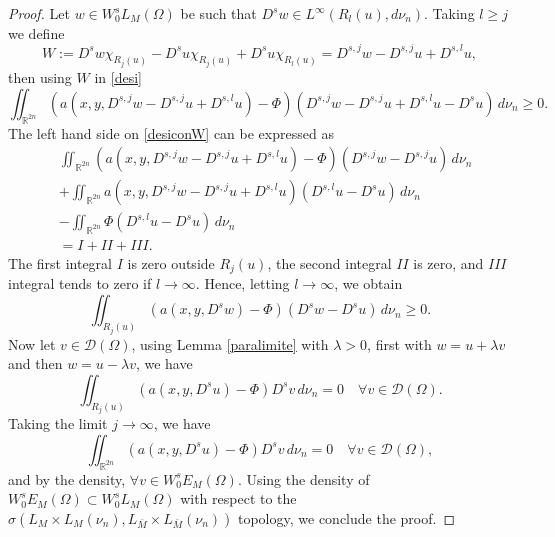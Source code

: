 \documentclass{amsart}
\newcommand{\R}{{\mathbb R}}
\theoremstyle{remark}
\theoremstyle{definition}
\numberwithin{equation}{section}
\begin{document}
\begin{proof}
Let $w \in W_0^sL_M(\Omega)$ be such that $D^s w \in L^\infty(R_l(u),d\nu_n)$. Taking $l\geq j$ we define
$$
W:=D^s w\chi_{R_j(u)}-D^s u\chi_{R_j(u)}+D^s u\chi_{R_{l}(u)}=D^{s,j}w-D^{s,j}u+D^{s,l}u,
$$
then using $W$ in \eqref{desi}
\begin{equation}\label{desiconW}
\iint_{\mathbb{R}^{2n}}(a(x,y,D^{s,j}w-D^{s,j}u+D^{s,l}u)-\Phi)(D^{s,j}w-D^{s,j}u+D^{s,l}u-D^su)\,d\nu_n \geq 0.
\end{equation}
The left hand side on \eqref{desiconW} can be expressed as
\begin{align*}
&\iint_{\R^{2n}}(a(x,y,D^{s,j} w - D^{s,j} u + D^{s,l} u) - \Phi)(D^{s,j} w - D^{s,j} u)\,d\nu_n 
\\
&+\iint_{\R^{2n}}a(x,y,D^{s,j} w - D^{s,j} u + D^{s,l} u)(D^{s,l} u - D^s u)\,d\nu_n 
\\
&-\iint_{\R^{2n}}\Phi(D^{s,l} u-D^s u)\, d\nu_n
\\
&=I+II+III.	
\end{align*}
The first integral $I$ is zero outside $R_j(u)$, the second integral $II$  is zero, and $III$ integral tends to zero if $l\to \infty$. Hence, letting $l \to \infty$, we obtain
$$
\iint_{R_j(u)} \left(a(x,y,D^s w) - \Phi \right)(D^s w - D^s u)\, d\nu_n \geq 0.
$$
Now let $v \in \mathcal{D}(\Omega)$, using Lemma \ref{paralimite} with $\lambda > 0$, first with $w = u + \lambda v$ and then $w = u - \lambda v$, we have
$$
\iint_{R_j(u)} \left(a(x,y,D^s u) - \Phi \right) D^s v \, d\nu_n = 0 \quad \forall v \in \mathcal{D}(\Omega).
$$
Taking the limit $j \to \infty$, we have
$$
\iint_{\mathbb{R}^{2n}} \left(a(x,y,D^s u) - \Phi \right) D^s v \, d\nu_n = 0 \quad \forall v \in \mathcal{D}(\Omega),
$$
and by the density, $\forall v \in W_0^s E_M(\Omega)$. Using the density of $W_0^s E_M(\Omega) \subset W_0^s L_M(\Omega)$ with respect to the $\sigma(L_M \times L_M(\nu_n), L_{\bar{M}} \times L_{\bar{M}}(\nu_n))$ topology, we conclude the proof.
\end{proof}
\end{document}
